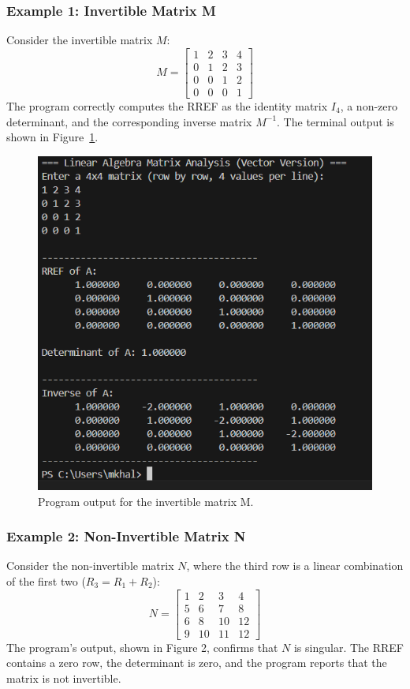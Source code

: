 \documentclass{article}
\begin{document}
\subsubsection{Example 1: Invertible Matrix M}
Consider the invertible matrix $M$:
\[
M = 
\begin{bmatrix}
1 & 2 & 3 & 4 \\
0 & 1 & 2 & 3 \\
0 & 0 & 1 & 2 \\
0 & 0 & 0 & 1
\end{bmatrix}
\]
The program correctly computes the RREF as the identity matrix $I_4$, a non-zero determinant, and the corresponding inverse matrix $M^{-1}$. The terminal output is shown in Figure~\ref{fig:output_m}.

\begin{figure}[h!]
    \centering
    \includegraphics[width=0.5\linewidth]{f1.png}
    \caption{Program output for the invertible matrix M.}
    \label{fig:output_m}
\end{figure}

\subsubsection{Example 2: Non-Invertible Matrix N}
Consider the non-invertible matrix $N$, where the third row is a linear combination of the first two ($R_3 = R_1 + R_2$):
\[
N = 
\begin{bmatrix}
1 & 2 & 3 & 4 \\
5 & 6 & 7 & 8 \\
6 & 8 & 10 & 12 \\
9 & 10 & 11 & 12
\end{bmatrix}
\]
The program's output, shown in Figure 2, confirms that $N$ is singular. The RREF contains a zero row, the determinant is zero, and the program reports that the matrix is not invertible.
\end{document}
